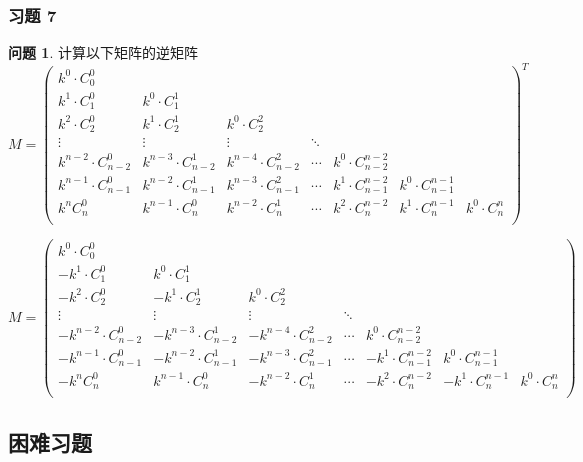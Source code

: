 \documentclass[11pt]{ctexart}
\theoremstyle{definition}
\newtheorem{qqq}{问题}[section]
\numberwithin{equation}{section}
\begin{document}
\subsubsection{习题 7}
\begin{qqq}
    计算以下矩阵的逆矩阵
    \begin{equation}   
    M=
    \begin{pmatrix}
        k^0\cdot C^0_0&&&&&&\\k^1\cdot C^0_1 &k^0\cdot C^1_1\\k^2\cdot C^0_2&k^1\cdot C^1_2&k^0\cdot C^2_2\\
        \vdots&\vdots&\vdots&\ddots\\k^{n-2}\cdot C^0_{n-2}&k^{n-3}\cdot C^1_{n-2}&k^{n-4}\cdot C^2_{n-2}&\cdots &k^{0}\cdot C^{n-2}_{n-2}\\
        k^{n-1}\cdot C^0_{n-1}&k^{n-2}\cdot C^1_{n-1}&k^{n-3}\cdot C^2_{n-1}&\cdots &k^{1}\cdot C^{n-2}_{n-1}&k^0\cdot C^{n-1}_{n-1}\\
        k^nC^0_n&k^{n-1}\cdot C^0_{n}&k^{n-2}\cdot C^1_{n}&\cdots &k^{2}\cdot C^{n-2}_{n}&k^{1}\cdot C^{n-1}_{n}&k^0\cdot C^{n}_{n}\\
    \end{pmatrix}^T
    \end{equation}
\end{qqq}
\begin{aaa}
    \[M=\begin{pmatrix}
        k^0\cdot C^0_0&&&&&&\\-k^1\cdot C^0_1 &k^0\cdot C^1_1\\-k^2\cdot C^0_2&-k^1\cdot C^1_2&k^0\cdot C^2_2\\
        \vdots&\vdots&\vdots&\ddots\\-k^{n-2}\cdot C^0_{n-2}&-k^{n-3}\cdot C^1_{n-2}&-k^{n-4}\cdot C^2_{n-2}&\cdots &k^{0}\cdot C^{n-2}_{n-2}\\
        -k^{n-1}\cdot C^0_{n-1}&-k^{n-2}\cdot C^1_{n-1}&-k^{n-3}\cdot C^2_{n-1}&\cdots &-k^{1}\cdot C^{n-2}_{n-1}&k^0\cdot C^{n-1}_{n-1}\\
        -k^nC^0_n&k^{n-1}\cdot C^0_{n}&-k^{n-2}\cdot C^1_{n}&\cdots &-k^{2}\cdot C^{n-2}_{n}&-k^{1}\cdot C^{n-1}_{n}&k^0\cdot C^{n}_{n}\\
    \end{pmatrix}\]
\end{aaa}

\subsection{困难习题}
\end{document}
